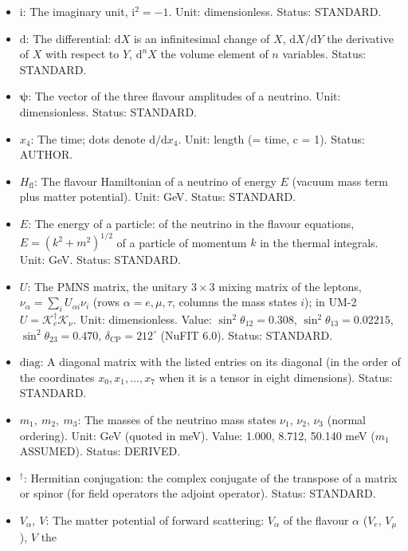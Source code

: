 \documentclass[
  10pt,
]{article}
\providecommand{\tightlist}{%
  \setlength{\itemsep}{0pt}\setlength{\parskip}{0pt}}
\begin{document}
\begin{itemize}
\tightlist
\item
  \(\mathrm{i}\): The imaginary unit, \(\mathrm{i}^2 = -1\). Unit:
  dimensionless. Status: STANDARD.
\item
  \(\mathrm{d}\): The differential: \(\mathrm{d}X\) is an infinitesimal
  change of \(X\), \(\mathrm{d}X/\mathrm{d}Y\) the derivative of \(X\)
  with respect to \(Y\), \(\mathrm{d}^nX\) the volume element of \(n\)
  variables. Status: STANDARD.
\item
  \(\boldsymbol{\psi}\): The vector of the three flavour amplitudes of a
  neutrino. Unit: dimensionless. Status: STANDARD.
\item
  \(x_4\): The time; dots denote \(\mathrm{d}/\mathrm{d}x_4\). Unit:
  length (= time, c = 1). Status: AUTHOR.
\item
  \(H_{\mathrm{fl}}\): The flavour Hamiltonian of a neutrino of energy
  \(E\) (vacuum mass term plus matter potential). Unit: GeV. Status:
  STANDARD.
\item
  \(E\): The energy of a particle: of the neutrino in the flavour
  equations, \(E = (k^2 + m^2)^{1/2}\) of a particle of momentum \(k\)
  in the thermal integrals. Unit: GeV. Status: STANDARD.
\item
  \(U\): The PMNS matrix, the unitary \(3 \times 3\) mixing matrix of
  the leptons, \(\nu_\alpha = \sum_iU_{\alpha i}\nu_i\) (rows
  \(\alpha = e, \mu, \tau\), columns the mass states \(i\)); in UM-2
  \(U = \mathcal{K}_e^\dagger\mathcal{K}_\nu\). Unit: dimensionless.
  Value: \(\sin^2\theta_{12} = 0.308\), \(\sin^2\theta_{13} = 0.02215\),
  \(\sin^2\theta_{23} = 0.470\), \(\delta_{\mathrm{CP}} = 212^\circ\)
  (NuFIT 6.0). Status: STANDARD.
\item
  \(\mathrm{diag}\): A diagonal matrix with the listed entries on its
  diagonal (in the order of the coordinates \(x_0, x_1, \dots, x_7\)
  when it is a tensor in eight dimensions). Status: STANDARD.
\item
  \(m_1,\ m_2,\ m_3\): The masses of the neutrino mass states \(\nu_1\),
  \(\nu_2\), \(\nu_3\) (normal ordering). Unit: GeV (quoted in meV).
  Value: 1.000, 8.712, 50.140 meV (\(m_1\) ASSUMED). Status: DERIVED.
\item
  \({}^\dagger\): Hermitian conjugation: the complex conjugate of the
  transpose of a matrix or spinor (for field operators the adjoint
  operator). Status: STANDARD.
\item
  \(V_\alpha,\ V\): The matter potential of forward scattering:
  \(V_\alpha\) of the flavour \(\alpha\) (\(V_e\), \(V_\mu\)), \(V\) the

\end{itemize}
\end{document}
